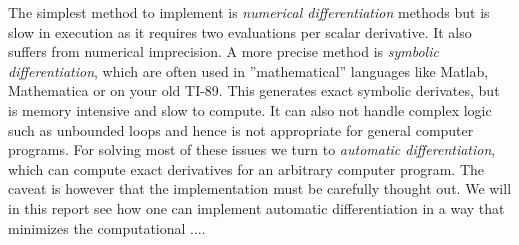 The simplest method to implement is \textit{numerical differentiation} methods 
but is slow in execution as it requires two evaluations per scalar derivative. 
It also suffers from numerical imprecision. A more precise method is 
\textit{symbolic differentiation}, which are often used in  ''mathematical'' languages
like Matlab, Mathematica or on your old TI-89.  This generates exact symbolic derivates, but 
is memory intensive and slow to compute. It can also not handle 
complex logic such as unbounded loops and hence is not appropriate for general computer programs. 
For solving most of these issues we turn to \textit{automatic differentiation}, which can 
compute exact derivatives for an arbitrary computer program. The caveat is however 
that the implementation must be carefully thought out. We will in this report
see how one can implement automatic differentiation in a way that minimizes 
the computational ....



